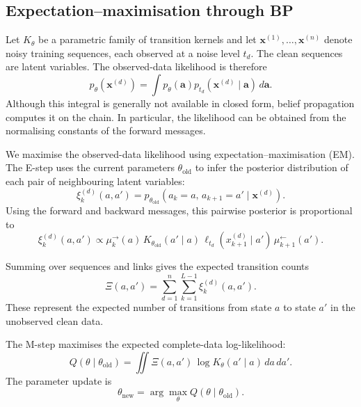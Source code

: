\documentclass{article}
\begin{document}
\subsection{Expectation--maximisation through BP}

Let $K_\theta$ be a parametric family of transition kernels
and let $\mathbf{x}^{(1)},\ldots,\mathbf{x}^{(n)}$ denote
noisy training sequences, each observed at a noise level
$t_d$. The clean sequences are latent variables. The
observed-data likelihood is therefore
\begin{equation}
    p_\theta(\mathbf{x}^{(d)})
    =
    \int
    p_\theta(\mathbf{a})
    p_{t_d}(\mathbf{x}^{(d)}\mid\mathbf{a})
    \,d\mathbf{a}.
\end{equation}
Although this integral is generally not available in
closed form, belief propagation computes it on the chain.
In particular, the likelihood can be obtained from the
normalising constants of the forward messages.

We maximise the observed-data likelihood using
expectation--maximisation (EM). The E-step uses the current
parameters $\theta_{\mathrm{old}}$ to infer the posterior
distribution of each pair of neighbouring latent variables:
\begin{equation}
    \xi_k^{(d)}(a,a')
    =
    p_{\theta_{\mathrm{old}}}
    \left(
        a_k=a,\,
        a_{k+1}=a'
        \mid \mathbf{x}^{(d)}
    \right).
\end{equation}
Using the forward and backward messages, this pairwise
posterior is proportional to
\begin{equation}
    \xi_k^{(d)}(a,a')
    \propto
    \mu_k^{\rightarrow}(a)\,
    K_{\theta_{\mathrm{old}}}(a'\mid a)\,
    \ell_{t_d}(x_{k+1}^{(d)}\mid a')\,
    \mu_{k+1}^{\leftarrow}(a').
    \label{eq:pairwise-posterior}
\end{equation}

Summing over sequences and links gives the expected
transition counts
\begin{equation}
    \Xi(a,a')
    =
    \sum_{d=1}^{n}
    \sum_{k=1}^{L-1}
    \xi_k^{(d)}(a,a').
\end{equation}
These represent the expected number of transitions from
state $a$ to state $a'$ in the unobserved clean data.

The M-step maximises the expected complete-data
log-likelihood:
\begin{equation}
    Q(\theta\mid\theta_{\mathrm{old}})
    =
    \iint
    \Xi(a,a')\,
    \log K_\theta(a'\mid a)
    \,da\,da'.
    \label{eq:em-objective}
\end{equation}
The parameter update is
\begin{equation}
    \theta_{\mathrm{new}}
    =
    \arg\max_\theta
    Q(\theta\mid\theta_{\mathrm{old}}).
\end{equation}
\end{document}

